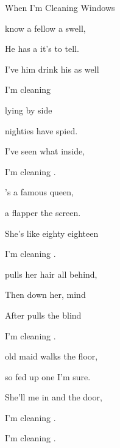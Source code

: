 \begin{SBSong}{When I'm Cleaning Windows}
\begin{SBVerse}
	 know a fellow  a swell, 
	
	He has a  it's  to tell. 
	
	I've  him drink his  as well 
	
	 I'm cleaning 
  \end{SBVerse}
  \CBPageBrk
  \begin{SBVerse}
	 lying  by side 
	
	 nighties  have spied. 
	
	I've  seen what  inside,
 
	 I'm cleaning .

	's a famous  queen, 
	
	 a flapper  the screen. 
	
	She's  like eighty  eighteen 
	
	 I'm cleaning .

	 pulls her hair all  behind, 
	
	Then  down her,  mind 
	
	After  pulls  the blind 
	
	 I'm cleaning .
  \end{SBVerse}
  \begin{SBVerse}
     old maid walks  the floor, 
	
	 so fed up one  I'm sure.
 
	She'll  me in and   the door,
	
	 I'm cleaning .
	
	 I'm cleaning .
  \end{SBVerse}
\end{SBSong}
